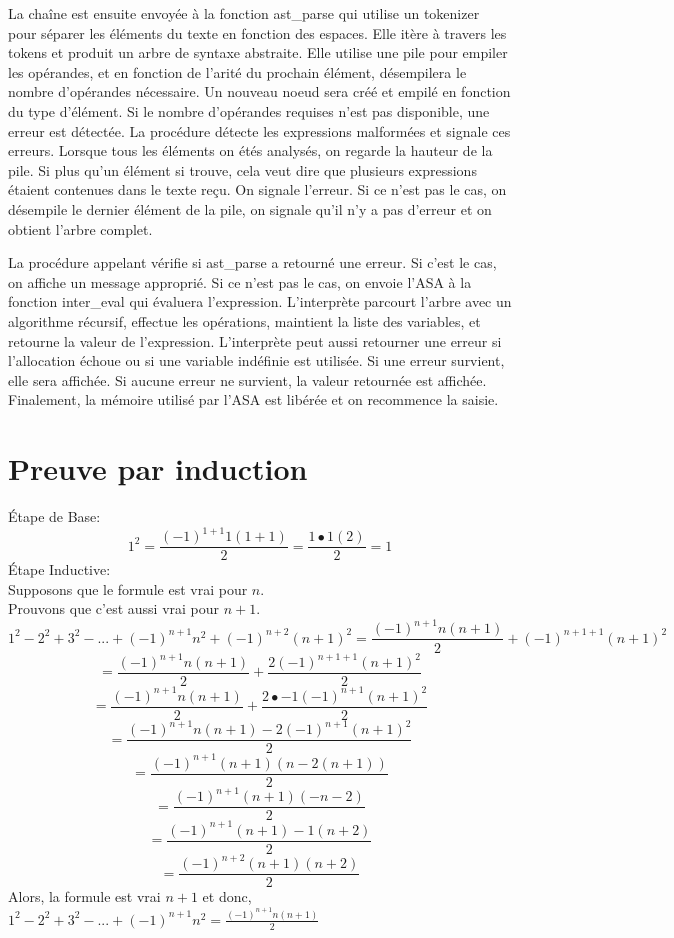 \documentclass[a4paper,12pt]{article}
\begin{document}
	La chaîne est ensuite envoyée à la fonction ast\_parse qui utilise un tokenizer pour séparer
	les éléments du texte en fonction des espaces. Elle itère à travers les tokens et produit un
	arbre de syntaxe abstraite. Elle utilise une pile pour empiler les opérandes, et en fonction
	de l'arité du prochain élément, désempilera le nombre d'opérandes nécessaire. Un nouveau
	noeud sera créé et empilé en fonction du type d'élément. Si le nombre d'opérandes requises
	n'est pas disponible, une erreur est détectée. La procédure détecte les expressions malformées
	et signale ces erreurs. Lorsque tous les éléments on étés analysés, on regarde la hauteur de
	la pile. Si plus qu'un élément si trouve, cela veut dire que plusieurs expressions étaient
	contenues dans le texte reçu. On signale l'erreur. Si ce n'est pas le cas, on désempile le dernier
	élément de la pile, on signale qu'il n'y a pas d'erreur et on obtient l'arbre complet.

	La procédure appelant vérifie si ast\_parse a retourné une erreur. Si c'est le cas, on affiche
	un message approprié. Si ce n'est pas le cas, on envoie l'ASA à la fonction inter\_eval qui évaluera
	l'expression. L'interprète parcourt l'arbre avec un algorithme récursif, effectue les opérations,
	maintient la liste des variables, et retourne la valeur de l'expression. L'interprète peut aussi
	retourner une erreur si l'allocation échoue ou si une variable indéfinie est utilisée. Si une erreur
	survient, elle sera affichée. Si aucune erreur ne survient, la valeur retournée est affichée.
	Finalement, la mémoire utilisé par l'ASA est libérée et on recommence la saisie.

\section{Preuve par induction}
Étape de Base:\\
	\[1^2 = \frac{(-1)^{1+1}1(1+1)}{2} = \frac{1\bullet 1 (2)}{2} = 1\]
Étape Inductive:\\
	Supposons que le formule est vrai pour $n$.\\
	Prouvons que c'est aussi vrai pour $n+1$.
	\[1^2 - 2^2 + 3^2 - ... + (-1)^{n+1}n^2 + (-1)^{n+2}(n+1)^2 = \frac{(-1)^{n+1}n(n+1)}{2}  + (-1)^{n+1+1}(n+1)^2 \]
	\[= \frac{(-1)^{n+1}n(n+1)}{2}  + \frac{2(-1)^{n+1+1}(n+1)^2}{2}\]
	\[= \frac{(-1)^{n+1}n(n+1)}{2}  + \frac{2\bullet-1(-1)^{n+1}(n+1)^2}{2}\]
	\[= \frac{(-1)^{n+1}n(n+1)  -2(-1)^{n+1}(n+1)^2}{2}\]
	\[= \frac{(-1)^{n+1}(n+1)(n  -2(n+1))}{2}\]
	\[= \frac{(-1)^{n+1}(n+1)(-n-2)}{2}\]
	\[= \frac{(-1)^{n+1}(n+1) -1 (n+2)}{2}\]
	\[= \frac{(-1)^{n+2}(n+1)(n+2)}{2}\]
	Alors, la formule est vrai $n+1$ et donc, $1^2 - 2^2 + 3^2 - ... + (-1)^{n+1}n^2 = \frac{(-1)^{n+1}n(n+1)}{2}$
\end{document}
